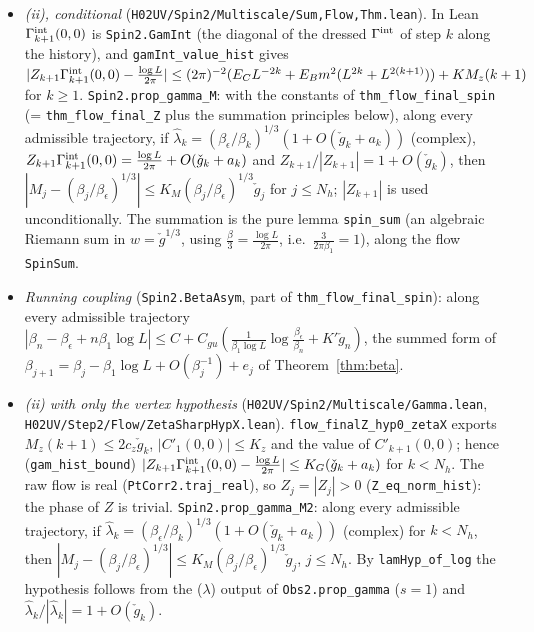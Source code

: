 \documentclass[11pt]{amsart}
\theoremstyle{definition}
\theoremstyle{remark}
\numberwithin{equation}{section}
\begin{document}
\begin{itemize}
  $|\log\vartheta^{(1)}_n-\frac13\log\frac{\beta_n}{\beta_\epsilon}|\le(K_Z/2+K_\lambda)/\beta_n$.
\item \emph{(ii), conditional} (\texttt{H02UV/Spin2/Multiscale/Sum,Flow,Thm.lean}). In Lean $\Gamma^{\rm int}_{k+1}(0,0)$ is
  \texttt{Spin2.GamInt} (the diagonal of the dressed $\Gamma^{\rm int}$ of step $k$ along the history), and
  \texttt{gamInt\_value\_hist} gives $|Z_{k+1}\Gamma^{\rm int}_{k+1}(0,0)-\frac{\log L}{2\pi}|\le(2\pi)^{-2}(E_CL^{-2k}+E_Bm^2(L^{2k}+L^{2(k+1)}))+KM_z(k+1)$
  for $k\ge1$. \texttt{Spin2.prop\_gamma\_M}: with the constants of \texttt{thm\_flow\_final\_spin} (= \texttt{thm\_flow\_final\_Z}
  plus the summation principles below), along every admissible trajectory, if
  $\hat\lambda_k=(\beta_\epsilon/\beta_k)^{1/3}(1+O(\check g_k+a_k))$ (complex),
  $Z_{k+1}\Gamma^{\rm int}_{k+1}(0,0)=\frac{\log L}{2\pi}+O(\check g_k+a_k)$ and $Z_{k+1}/|Z_{k+1}|=1+O(\check g_k)$, then
  $|M_j-(\beta_j/\beta_\epsilon)^{1/3}|\le K_M(\beta_j/\beta_\epsilon)^{1/3}\check g_j$ for $j\le N_h$; $|Z_{k+1}|$ is used
  unconditionally. The summation is the pure lemma \texttt{spin\_sum} (an algebraic Riemann sum in $w=\check g^{1/3}$,
  using $\frac{\beta}{3}=\frac{\log L}{2\pi}$, i.e.\ $\frac3{2\pi\beta_1}=1$), along the flow \texttt{SpinSum}.
\item \emph{Running coupling} (\texttt{Spin2.BetaAsym}, part of \texttt{thm\_flow\_final\_spin}): along every admissible
  trajectory $|\beta_n-\beta_\epsilon+n\beta_1\log L|\le C+C_{gu}(\frac1{\beta_1\log L}\log\frac{\beta_\epsilon}{\beta_n}+K'\check g_n)$,
  the summed form of $\beta_{j+1}=\beta_j-\beta_1\log L+O(\beta_j^{-1})+e_j$ of Theorem~\ref{thm:beta}.
\item \emph{(ii) with only the vertex hypothesis} (\texttt{H02UV/Spin2/Multiscale/Gamma.lean}, \texttt{H02UV/Step2/Flow/ZetaSharpHypX.lean}).
  \texttt{flow\_finalZ\_hyp0\_zetaX} exports $M_z(k+1)\le2c_z\check g_k$, $|C'_1(0,0)|\le K_z$ and the value of
  $C'_{k+1}(0,0)$; hence (\texttt{gam\_hist\_bound}) $|Z_{k+1}\Gamma^{\rm int}_{k+1}(0,0)-\frac{\log L}{2\pi}|\le K_G(\check g_k+a_k)$
  for $k<N_h$. The raw flow is real (\texttt{PtCorr2.traj\_real}), so $Z_j=|Z_j|>0$ (\texttt{Z\_eq\_norm\_hist}): the phase
  of $Z$ is trivial. \texttt{Spin2.prop\_gamma\_M2}: along every admissible trajectory, if
  $\hat\lambda_k=(\beta_\epsilon/\beta_k)^{1/3}(1+O(\check g_k+a_k))$ (complex) for $k<N_h$, then
  $|M_j-(\beta_j/\beta_\epsilon)^{1/3}|\le K_M(\beta_j/\beta_\epsilon)^{1/3}\check g_j$, $j\le N_h$. By \texttt{lamHyp\_of\_log} the
  hypothesis follows from the ($\lambda$) output of \texttt{Obs2.prop\_gamma} ($s=1$) and $\hat\lambda_k/|\hat\lambda_k|=1+O(\check g_k)$.

\end{itemize}
\end{document}

